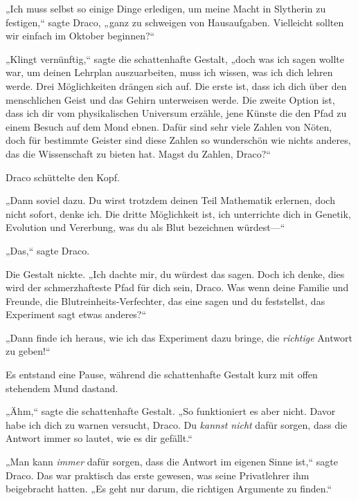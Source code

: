 {„Ich muss selbst so einige Dinge erledigen, um meine Macht in Slytherin zu festigen,“ sagte Draco, „ganz zu schweigen von Hausaufgaben. Vielleicht sollten wir einfach im Oktober beginnen?“

„Klingt vernünftig,“ sagte die schattenhafte Gestalt, „doch was ich sagen wollte war, um deinen Lehrplan auszuarbeiten, muss ich wissen, was ich dich lehren werde. Drei Möglichkeiten drängen sich auf. Die erste ist, dass ich dich über den menschlichen Geist und das Gehirn unterweisen werde. Die zweite Option ist, dass ich dir vom physikalischen Universum erzähle, jene Künste die den Pfad zu einem Besuch auf dem Mond ebnen. Dafür sind sehr viele Zahlen von Nöten, doch für bestimmte Geister sind diese Zahlen so wunderschön wie nichts anderes, das die Wissenschaft zu bieten hat. Magst du Zahlen, Draco?“

Draco schüttelte den Kopf.

„Dann soviel dazu. Du wirst trotzdem deinen Teil Mathematik erlernen, doch nicht sofort, denke ich. Die dritte Möglichkeit ist, ich unterrichte dich in Genetik, Evolution und Vererbung, was du als Blut bezeichnen würdest—“

„Das,“ sagte Draco.

Die Gestalt nickte. „Ich dachte mir, du würdest das sagen. Doch ich denke, dies wird der schmerzhafteste Pfad für dich sein, Draco. Was wenn deine Familie und Freunde, die Blutreinheits-Verfechter, das eine sagen und du feststellst, das Experiment sagt etwas anderes?“

„Dann finde ich heraus, wie ich das Experiment dazu bringe, die \emph{richtige} Antwort zu geben!“

Es entstand eine Pause, während die schattenhafte Gestalt kurz mit offen stehendem Mund dastand.

„Ähm,“ sagte die schattenhafte Gestalt. „So funktioniert es aber nicht. Davor habe ich dich zu warnen versucht, Draco. Du \emph{kannst nicht} dafür sorgen, dass die Antwort immer so lautet, wie es dir gefällt.“

„Man kann \emph{immer} dafür sorgen, dass die Antwort im eigenen Sinne ist,“ sagte Draco. Das war praktisch das erste gewesen, was seine Privatlehrer ihm beigebracht hatten. „Es geht nur darum, die richtigen Argumente zu finden.“

}
